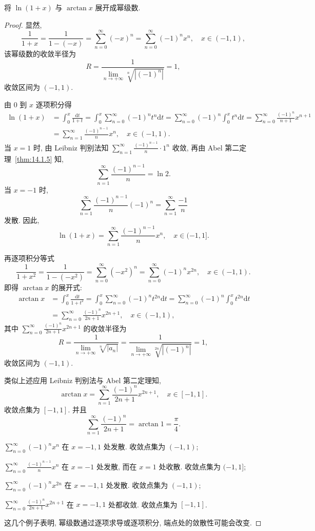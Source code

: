 \begin{example}\label{ex:14.1.7}
将 $\ln(1+x)$ 与 $\arctan x$ 展开成幂级数.
\end{example}

\begin{proof}
显然,
\[
  \frac{1}{1+x}=\frac{1}{1-(-x)}=\sum_{n=0}^{\infty}(-x)^{n}=\sum_{n=0}^{\infty}(-1)^{n}x^{n},\quad x\in(-1,1),
\]
该幂级数的收敛半径为
\[
  R=\frac{1}{\lim\limits_{n\to+\infty}\sqrt[n]{|(-1)^{n}|}}=1,
\]
收敛区间为 $(-1,1)$.

由 $0$ 到 $x$ 逐项积分得
\[
  \begin{aligned}
    \ln(1+x)&=\int_{0}^{x}\frac{\mathrm{d}t}{1+t}=\int_{0}^{x}\sum_{n=0}^{\infty}(-1)^{n}t^{n}\mathrm{d}t=\sum_{n=0}^{\infty}(-1)^{n}\int_{0}^{x}t^{n}\mathrm{d}t=\sum_{n=0}^{\infty}\frac{(-1)^{n}}{n+1}x^{n+1}\\
    &=\sum_{n=1}^{\infty}\frac{(-1)^{n-1}}{n}x^{n},\quad x\in(-1,1).
  \end{aligned}
\]
当 $x=1$ 时, 由 Leibniz 判别法知 $\sum_{n=1}^{\infty}\frac{(-1)^{n-1}}{n}\cdot1^{n}$ 收敛, 再由 Abel 第二定理~\ref{thm:14.1.5} 知,
\[
  \sum_{n=1}^{\infty}\frac{(-1)^{n-1}}{n}=\ln2.
\]
当 $x=-1$ 时,
\[
  \sum_{n=1}^{\infty}\frac{(-1)^{n-1}}{n}(-1)^{n}=\sum_{n=1}^{\infty}\frac{-1}{n}
\]
发散. 因此,
\[
  \ln(1+x)=\sum_{n=1}^{\infty}\frac{(-1)^{n-1}}{n}x^{n},\quad x\in(-1,1].
\]

再逐项积分等式
\[
  \frac{1}{1+x^{2}}=\frac{1}{1-(-x^{2})}=\sum_{n=0}^{\infty}(-x^{2})^{n}=\sum_{n=0}^{\infty}(-1)^{n}x^{2n},\quad x\in(-1,1).
\]
即得 $\arctan x$ 的展开式:
\[
  \begin{aligned}
    \arctan x&=\int_{0}^{x}\frac{\mathrm{d}t}{1+t^{2}}=\int_{0}^{x}\sum_{n=0}^{\infty}(-1)^{n}t^{2n}\mathrm{d}t=\sum_{n=0}^{\infty}(-1)^{n}\int_{0}^{x}t^{2n}\mathrm{d}t\\
    &=\sum_{n=0}^{\infty}\frac{(-1)^{n}}{2n+1}x^{2n+1},\quad x\in(-1,1),
  \end{aligned}
\]
其中 $\sum_{n=0}^{\infty}\frac{(-1)^{n}}{2n+1}x^{2n+1}$ 的收敛半径为
\[
  R=\frac{1}{\lim\limits_{n\to+\infty}\sqrt[n]{|a_{n}|}}=\frac{1}{\lim\limits_{n\to+\infty}\sqrt[2n]{|(-1)^{n}|}}=1,
\]
收敛区间为 $(-1,1)$.

类似上述应用 Leibniz 判别法与 Abel 第二定理知,
\[
  \arctan x=\sum_{n=1}^{\infty}\frac{(-1)^{n}}{2n+1}x^{2n+1},\quad x\in[-1,1].
\]
收敛点集为 $[-1,1]$. 并且
\[
  \sum_{n=1}^{\infty}\frac{(-1)^{n}}{2n+1}=\arctan1=\frac{\pi}{4}.
\]

$\sum_{n=0}^{\infty}(-1)^{n}x^{n}$ 在 $x=-1,1$ 处发散. 收敛点集为 $(-1,1)$;

$\sum_{n=0}^{\infty}\frac{(-1)^{n-1}}{n}x^{n}$ 在 $x=-1$ 处发散, 而在 $x=1$ 处收散. 收敛点集为 $(-1,1]$;

$\sum_{n=0}^{\infty}(-1)^{n}x^{2n}$ 在 $x=-1,1$ 处发散. 收敛点集为 $(-1,1)$;

$\sum_{n=0}^{\infty}\frac{(-1)^{n}}{2n+1}x^{2n+1}$ 在 $x=-1,1$ 处都收敛. 收敛点集为 $[-1,1]$.

这几个例子表明, 幂级数通过逐项求导或逐项积分, 端点处的敛散性可能会改变.
\end{proof}

